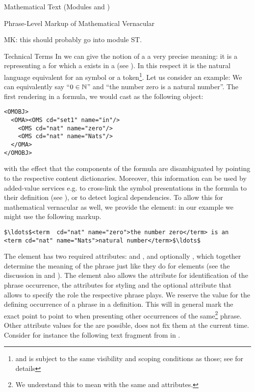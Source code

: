 \begin{tchapter}[id=mtxt,short=Mathematical Text]{Mathematical Text (Modules
   and )}
\begin{tsection}[id=phrases]{Phrase-Level Markup of Mathematical Vernacular}
\begin{oldpart}{MK: this should probably go into module ST.}
\begin{tsubsection}[id=terms]{Technical Terms}
  In \omdoc we can give the notion of a  a very precise
  meaning: it is a  representing a  for which a
   exists in a  (see
  ). In this respect it is the natural language equivalent for
  an {\openmath} symbol or a {\cmathml} token\footnote{and is subject to the same
    visibility and scoping conditions as those; see  for
    details}. Let us consider an example: We can equivalently say ``$0\in{\mathbb{N}}$'' and ``the
  number zero is a natural number''. The first rendering in a formula, we would cast as
  the following {\openmath} object:
\begin{lstlisting}[language=OpenMath,numbers=none]
<OMOBJ>
  <OMA><OMS cd="set1" name="in"/>
    <OMS cd="nat" name="zero"/>
    <OMS cd="nat" name="Nats"/>
  </OMA>
</OMOBJ>
\end{lstlisting}
  with the effect that the components of the formula are disambiguated by pointing to the
  respective content dictionaries. Moreover, this information can be used by added-value
  services e.g. to cross-link the symbol presentations in the formula to their definition
  (see ), or to detect logical dependencies. To allow this for
  mathematical vernacular as well, we provide the  element: in our example
  we might use the following markup.
\begin{lstlisting}[language=OpenMath,numbers=none,mathescape]
$\ldots$<term  cd="nat" name="zero">the number zero</term> is an 
<term cd="nat" name="Nats">natural number</term>$\ldots$
\end{lstlisting}
The  element has two required attributes:  and
, and optionally , which together determine the meaning of the phrase just like
they do for  elements (see the discussion in
 and ). The  element also
allows the attribute  for identification of the phrase
occurrence, the {\css} attributes for styling and the optional
 attribute that allows to specify the role the respective phrase
plays. We reserve the value  for the defining occurrence
of a phrase in a definition.  This will in general mark the exact point to point to when
presenting other occurrences of the same\footnote{We understand this to mean with the same
   and  attributes.} phrase. Other attribute
values for the  are possible, \omdoc does not fix them at the
current time.  Consider for instance the following text fragment from
 in .


\end{tsubsection}
\end{oldpart}
\end{tsection}
\end{tchapter}
